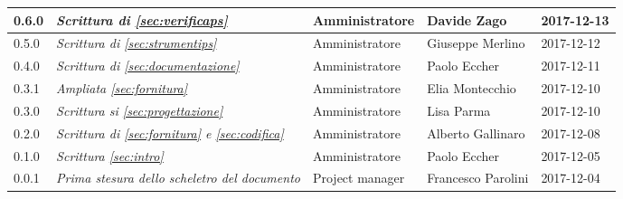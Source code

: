 \begin{table}[H]
\begin{tabular}{p{2cm}|C{4cm}|C{3cm}|C{3cm}|R{2cm}}
		0.6.0  & \emph{Scrittura di \ref{sec:verificaps}} &  Amministratore & Davide Zago  & 2017-12-13 \\
		\hline
		
		0.5.0  & \emph{Scrittura di \ref{sec:strumentips}} & Amministratore & Giuseppe Merlino & 2017-12-12\\
		\hline
		
		0.4.0  &\emph{Scrittura di \ref{sec:documentazione}}& Amministratore & Paolo Eccher  & 2017-12-11 \\
		\hline
		
		0.3.1 & \emph{Ampliata \ref{sec:fornitura}}& Amministratore & Elia Montecchio & 2017-12-10 \\
		\hline
		
		0.3.0 & \emph{Scrittura si \ref{sec:progettazione}} & Amministratore & Lisa Parma & 2017-12-10 \\
		\hline
		
		0.2.0 & \emph{Scrittura di \ref{sec:fornitura} e \ref{sec:codifica}} & Amministratore & Alberto Gallinaro & 2017-12-08 \\
		\hline
		
		0.1.0 & \emph{Scrittura \ref{sec:intro}} & Amministratore & Paolo Eccher & 2017-12-05 \\
		\hline
		
		0.0.1 &\emph{Prima stesura dello scheletro del documento} &  Project manager & Francesco Parolini & 2017-12-04 \\
		
	

	\end{tabular}
	
\end{table}


\clearpage